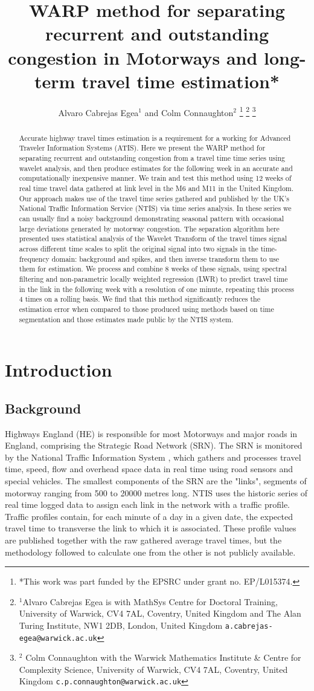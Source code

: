 \documentclass[a4paper, 10pt, conference]{ieeeconf}      %
\title{\LARGE \bf
WARP method for separating recurrent and outstanding congestion in Motorways and long-term travel time estimation*
}
\author{Alvaro Cabrejas Egea$^{1}$ and Colm Connaughton$^{2}$%
\thanks{*This work was part funded by the EPSRC under grant no. EP/L015374.}%
\thanks{$^{1}$Alvaro Cabrejas Egea is with MathSys Centre for Doctoral Training, University of Warwick, CV4 7AL, Coventry, United Kingdom and The Alan Turing Institute, NW1 2DB, London, United Kingdom
        {\tt\small a.cabrejas-egea@warwick.ac.uk}}%
\thanks{$^{2}$ Colm Connaughton with the Warwick Mathematics Institute \& Centre for Complexity Science, University of Warwick,
        CV4 7AL, Coventry, United Kingdom
        {\tt\small c.p.connaughton@warwick.ac.uk}}%
}
\begin{document}
\maketitle
\thispagestyle{empty}
\pagestyle{empty}


\begin{abstract}
Accurate highway travel times estimation is a requirement for a working for Advanced Traveler Information Systems (ATIS).
Here we present the WARP method for separating recurrent and outstanding congestion from a travel time time series using wavelet analysis, and then produce estimates for the following week in an accurate and computationally inexpensive manner. 
We train and test this method using 12 weeks of real time travel data gathered at link level in the M6 and M11 in the United Kingdom.
Our approach makes use of the travel time series gathered and published by the UK's National Traffic Information Service (NTIS) via time series analysis.
In these series we can usually find a noisy background demonstrating seasonal pattern with occasional large deviations generated by motorway congestion.
The separation algorithm here presented uses statistical analysis of the Wavelet Transform of the travel times signal across different time scales to split the original signal into two signals in the time-frequency domain: background and spikes, and then inverse transform them to use them for estimation.
We process and combine 8 weeks of these signals, using spectral filtering and non-parametric locally weighted regression (LWR) to predict travel time in the link in the following week with a resolution of one minute, repeating this process 4 times on a rolling basis.
We find that this method significantly reduces the estimation error when compared to those produced using methods based on time segmentation and those estimates made public by the NTIS system.
\end{abstract}
\section{Introduction} \label{Introduction}
\subsection{Background} \label{Background}
Highways England (HE) is responsible for most Motorways and major roads in England, comprising the Strategic Road Network (SRN).
The SRN is monitored by the National Traffic Information System \cite{NTIS}, which gathers and processes travel time, speed, flow and overhead space data in real time using road sensors and special vehicles.
The smallest components of the SRN are the "links", segments of motorway ranging from 500 to 20000 metres long.
NTIS uses the historic series of real time logged data to assign each link in the network with a traffic profile.
Traffic profiles contain, for each minute of a day in a given date, the expected travel time to transverse the link to which it is associated. 
These profile values are published together with the raw gathered average travel times, but the methodology followed to calculate one from the other is not publicly available.
\end{document}
